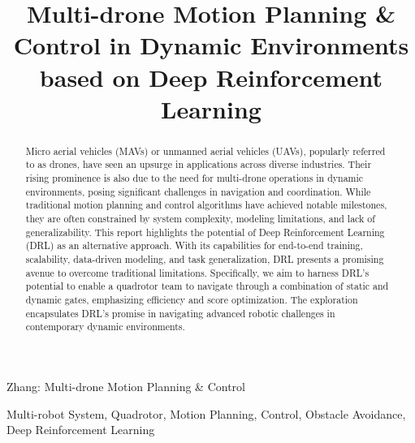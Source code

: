 \documentclass[letterpaper,journal,twoside]{IEEEtran}
\begin{document}
\title{Multi-drone Motion Planning \& Control in Dynamic Environments based on Deep Reinforcement Learning}

\author{
}

\maketitle

\begingroup
\renewcommand\thefootnote{}
\endgroup

%
{Zhang: Multi-drone Motion Planning \& Control}



\begin{abstract}
  Micro aerial vehicles (MAVs) or unmanned aerial vehicles (UAVs), popularly referred to as drones, have seen an upsurge in applications across diverse industries. Their rising prominence is also due to the need for multi-drone operations in dynamic environments, posing significant challenges in navigation and coordination. While traditional motion planning and control algorithms have achieved notable milestones, they are often constrained by system complexity, modeling limitations, and lack of generalizability. This report highlights the potential of Deep Reinforcement Learning (DRL) as an alternative approach. With its capabilities for end-to-end training, scalability, data-driven modeling, and task generalization, DRL presents a promising avenue to overcome traditional limitations. Specifically, we aim to harness DRL's potential to enable a quadrotor team to navigate through a combination of static and dynamic gates, emphasizing efficiency and score optimization. The exploration encapsulates DRL's promise in navigating advanced robotic challenges in contemporary dynamic environments.
\end{abstract}

\begin{IEEEkeywords}
  Multi-robot System, Quadrotor, Motion Planning, Control, 
  Obstacle Avoidance, Deep Reinforcement Learning
\end{IEEEkeywords}
\end{document}
